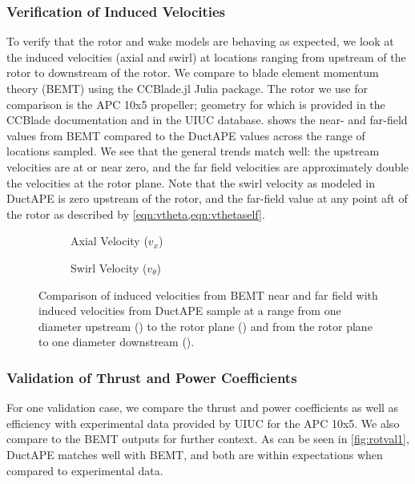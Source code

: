 \subsubsection{Verification of Induced Velocities}

To verify that the rotor and wake models are behaving as expected, we look at the induced velocities (axial and swirl) at locations ranging from upstream of the rotor to downstream of the rotor.
%
We compare to blade element momentum theory (BEMT) using the CCBlade.jl Julia package.
%
The rotor we use for comparison is the APC 10x5 propeller; geometry for which is provided in the CCBlade documentation and in the UIUC database.
%
 shows the near- and far-field values from BEMT compared to the DuctAPE values across the range of locations sampled.
%
We see that the general trends match well: the upstream velocities are at or near zero, and the far field velocities are approximately double the velocities at the rotor plane.
%
Note that the swirl velocity as modeled in DuctAPE is zero upstream of the rotor, and the far-field value at any point aft of the rotor as described by \cref{eqn:vtheta,eqn:vthetaself}.


\begin{figure}[h!]
     \centering
     \begin{subfigure}[t]{0.45\textwidth}
        \centering
        \raisebox{-3em}{}
        \caption{Axial Velocity (\(v_x\))}
        \label{}
     \end{subfigure}
     \hfill
     \begin{subfigure}[t]{0.45\textwidth}
         \centering
        \raisebox{-3em}{}
        \caption{Swirl Velocity (\(v_\theta\))}
        \label{}
     \end{subfigure}
     \caption{Comparison of induced velocities from BEMT near and far field with induced velocities from DuctAPE sample at a range from one diameter upstream () to the rotor plane () and from the rotor plane to one diameter downstream ().}
    \label{fig:inducedvelcheck}
\end{figure}


\subsubsection{Validation of Thrust and Power Coefficients}

For one validation case, we compare the thrust and power coefficients as well as efficiency with experimental data provided by UIUC for the APC 10x5.
%
We also compare to the BEMT outputs for further context.
%
As can be seen in \cref{fig:rotval1}, DuctAPE matches well with BEMT, and both are within expectations when compared to experimental data.


